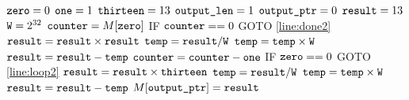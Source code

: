 \documentclass[11pt]{article}
\begin{document}
\begin{enumerate}
\begin{algorithm}[H]
\setcounter{AlgoLine}{-1}
$\texttt{zero} = 0$\;
$\texttt{one} = 1$\;
$\texttt{thirteen} = 13$\;
$\texttt{output\_len} = 1$\;
$\texttt{output\_ptr} = 0$\;
$\texttt{result} = 13$\;
$\texttt{W} = 2^{32}$\;
$\texttt{counter} = M[\texttt{zero}]$\;
\Indp
IF $\texttt{counter} == 0$ GOTO \ref{line:done2}\; \label{line:loop2}
$\texttt{result} = \texttt{result} \times \texttt{result}$\;
$\texttt{temp} = \texttt{result} / \texttt{W}$\;
$\texttt{temp} = \texttt{temp} \times \texttt{W}$\;
$\texttt{result} = \texttt{result} - \texttt{temp}$\;
$\texttt{counter} = \texttt{counter} - \texttt{one}$\;
IF $\texttt{zero} == 0$ GOTO \ref{line:loop2}\;
\Indm
$\texttt{result} = \texttt{result} \times \texttt{thirteen}$\;
\label{line:done2}
$\texttt{temp} = \texttt{result} / \texttt{W}$\;
$\texttt{temp} = \texttt{temp} \times \texttt{W}$\;
$\texttt{result} = \texttt{result} - \texttt{temp}$\;
$M[\texttt{output\_ptr}]=\texttt{result}$\; 
\end{algorithm}


\end{enumerate}
\end{document}
